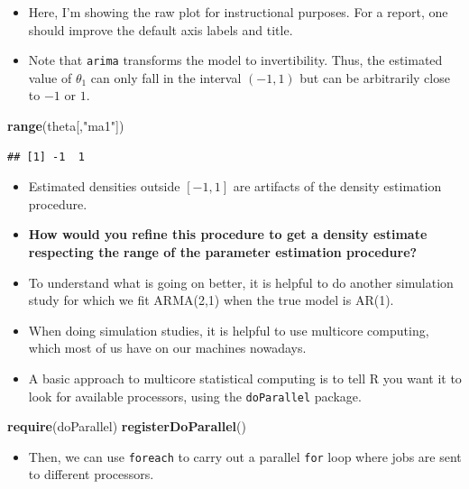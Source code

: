 \documentclass[]{article}
\newenvironment{Shaded}{\begin{snugshade}}{\end{snugshade}}
\newcommand{\KeywordTok}[1]{\textcolor[rgb]{0.13,0.29,0.53}{\textbf{#1}}}
\newcommand{\StringTok}[1]{\textcolor[rgb]{0.31,0.60,0.02}{#1}}
\newcommand{\NormalTok}[1]{#1}
\providecommand{\tightlist}{%
  \setlength{\itemsep}{0pt}\setlength{\parskip}{0pt}}
\begin{document}
\begin{itemize}
\item
  Here, I'm showing the raw plot for instructional purposes. For a
  report, one should improve the default axis labels and title.
\item
  Note that \texttt{arima} transforms the model to invertibility. Thus,
  the estimated value of \(\theta_1\) can only fall in the interval
  \((-1,1)\) but can be arbitrarily close to \(-1\) or \(1\).
\end{itemize}

\begin{Shaded}
\begin{Highlighting}[]
\KeywordTok{range}\NormalTok{(theta[,}\StringTok{"ma1"}\NormalTok{])}
\end{Highlighting}
\end{Shaded}

\begin{verbatim}
## [1] -1  1
\end{verbatim}

\begin{itemize}
\item Estimated densities outside $[-1,1]$ are artifacts of the density estimation procedure.
\item \textbf{How would you refine this procedure to get a density estimate respecting the range of the parameter estimation procedure? }
\item
  To understand what is going on better, it is helpful to do another
  simulation study for which we fit ARMA(2,1) when the true model is
  AR(1).
\item
  When doing simulation studies, it is helpful to use multicore
  computing, which most of us have on our machines nowadays.
\item
  A basic approach to multicore statistical computing is to tell R you
  want it to look for available processors, using the
  \texttt{doParallel} package.
\end{itemize}

\begin{Shaded}
\begin{Highlighting}[]
\KeywordTok{require}\NormalTok{(doParallel)}
\KeywordTok{registerDoParallel}\NormalTok{()}
\end{Highlighting}
\end{Shaded}

\begin{itemize}
\tightlist
\item
  Then, we can use \texttt{foreach} to carry out a parallel \texttt{for}
  loop where jobs are sent to different processors.
\end{itemize}
\end{document}
